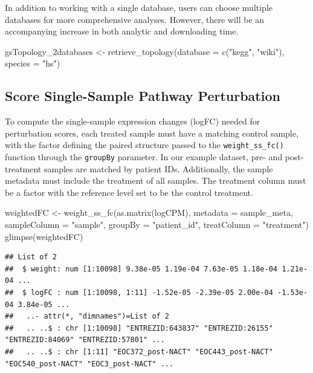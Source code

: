 \documentclass[9pt,a4paper,]{extarticle}
\newenvironment{Shaded}{\begin{snugshade}}{\end{snugshade}}
\newcommand{\AttributeTok}[1]{\textcolor[rgb]{0.77,0.63,0.00}{#1}}
\newcommand{\FunctionTok}[1]{\textcolor[rgb]{0.00,0.00,0.00}{#1}}
\newcommand{\NormalTok}[1]{#1}
\newcommand{\OtherTok}[1]{\textcolor[rgb]{0.56,0.35,0.01}{#1}}
\newcommand{\StringTok}[1]{\textcolor[rgb]{0.31,0.60,0.02}{#1}}
\begin{document}
In addition to working with a single database, users can choose multiple databases for more comprehensive analyses.
However, there will be an accompanying increase in both analytic and downloading time.

\begin{Shaded}
\begin{Highlighting}[]
\NormalTok{gsTopology\_2databases }\OtherTok{\textless{}{-}} \FunctionTok{retrieve\_topology}\NormalTok{(}\AttributeTok{database =} \FunctionTok{c}\NormalTok{(}\StringTok{"kegg"}\NormalTok{, }\StringTok{"wiki"}\NormalTok{), }
                                           \AttributeTok{species =} \StringTok{"hs"}\NormalTok{)}
\end{Highlighting}
\end{Shaded}

\hypertarget{score-single-sample-pathway-perturbation}{%
\subsection{Score Single-Sample Pathway Perturbation}\label{score-single-sample-pathway-perturbation}}

To compute the single-sample expression changes (logFC) needed for perturbation scores, each treated sample must have a matching control sample, with the factor defining the paired structure passed to the \texttt{weight\_ss\_fc()} function through the \texttt{groupBy} parameter.
In our example dataset, pre- and post-treatment samples are matched by patient IDs.
Additionally, the sample metadata must include the treatment of all samples. The treatment column must be a factor with the reference level set to be the control treatment.

\begin{Shaded}
\begin{Highlighting}[]
\NormalTok{weightedFC }\OtherTok{\textless{}{-}} \FunctionTok{weight\_ss\_fc}\NormalTok{(}\FunctionTok{as.matrix}\NormalTok{(logCPM), }\AttributeTok{metadata =}\NormalTok{ sample\_meta,}
 \AttributeTok{sampleColumn =} \StringTok{"sample"}\NormalTok{, }\AttributeTok{groupBy =} \StringTok{"patient\_id"}\NormalTok{, }\AttributeTok{treatColumn =} \StringTok{"treatment"}\NormalTok{)}
\FunctionTok{glimpse}\NormalTok{(weightedFC)}
\end{Highlighting}
\end{Shaded}

\begin{verbatim}
## List of 2
##  $ weight: num [1:10098] 9.38e-05 1.19e-04 7.63e-05 1.18e-04 1.21e-04 ...
##  $ logFC : num [1:10098, 1:11] -1.52e-05 -2.39e-05 2.00e-04 -1.53e-04 3.84e-05 ...
##   ..- attr(*, "dimnames")=List of 2
##   .. ..$ : chr [1:10098] "ENTREZID:643837" "ENTREZID:26155" "ENTREZID:84069" "ENTREZID:57801" ...
##   .. ..$ : chr [1:11] "EOC372_post-NACT" "EOC443_post-NACT" "EOC540_post-NACT" "EOC3_post-NACT" ...
\end{verbatim}
\end{document}
